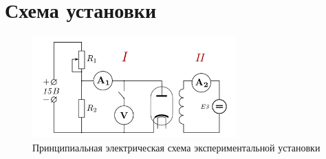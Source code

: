 \documentclass[12pt]{article}
\begin{document}
\section{Схема установки}
\begin{figure}
\caption{Принципиальная электрическая схема экспериментальной установки}
\includegraphics[width=0.7\textwidth]{scheme.png}
\end{figure}

\newpage
\end{document}
